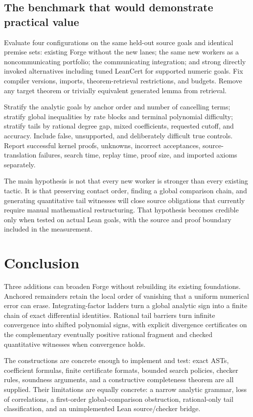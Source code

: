 \documentclass[11pt,a4paper]{article}
\theoremstyle{definition}\newtheorem{definition}[theorem]{Definition}
\begin{document}
\subsection{The benchmark that would demonstrate practical value}

Evaluate four configurations on the same held-out source goals and identical
premise sets: existing Forge without the new lanes; the same new workers as a
noncommunicating portfolio; the communicating integration; and strong directly
invoked alternatives including tuned LeanCert for supported numeric goals.
Fix compiler versions, imports, theorem-retrieval restrictions, and budgets.
Remove any target theorem or trivially equivalent generated lemma from retrieval.

Stratify the analytic goals by anchor order and number of cancelling terms;
stratify global inequalities by rate blocks and terminal polynomial difficulty;
stratify tails by rational degree gap, mixed coefficients, requested cutoff,
and accuracy. Include false, unsupported, and deliberately difficult true
controls. Report successful kernel proofs, unknowns, incorrect acceptances,
source-translation failures, search time, replay time, proof size, and imported
axioms separately.

The main hypothesis is not that every new worker is stronger than every
existing tactic. It is that preserving contact order, finding a global
comparison chain, and generating quantitative tail witnesses will close source
obligations that currently require manual mathematical restructuring. That
hypothesis becomes credible only when tested on actual Lean goals, with the
source and proof boundary included in the measurement.

\section{Conclusion}

Three additions can broaden Forge without rebuilding its existing foundations.
Anchored remainders retain the local order of vanishing that a uniform numerical
error can erase. Integrating-factor ladders turn a global analytic sign into a
finite chain of exact differential identities. Rational tail barriers turn
infinite convergence into shifted polynomial signs, with explicit divergence
certificates on the complementary eventually positive rational fragment and
checked quantitative witnesses when convergence holds.

The constructions are concrete enough to implement and test: exact ASTs,
coefficient formulas, finite certificate formats, bounded search policies,
checker rules, soundness arguments, and a constructive completeness theorem are
all supplied. Their limitations are equally concrete: a narrow analytic grammar,
loss of correlations, a first-order global-comparison obstruction, rational-only
tail classification, and an unimplemented Lean source/checker bridge.
\end{document}
